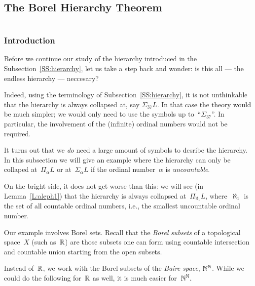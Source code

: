 \documentclass[main.tex]{subfiles}
\begin{document}
%
%
\subsection{The Borel Hierarchy Theorem}$\,$\\
\subsubsection{Introduction}$\,$\\
Before we continue our study of the hierarchy introduced in the
Subsection~\ref{SS:hierarchy}, let us take a step back and wonder: 
 is this all --- the endless hierarchy --- neccesary?

Indeed,
using the terminology of Subsection~\ref{SS:hierarchy},
it is not unthinkable
that the hierarchy is always collapsed
at, say $\Sigma_{37} L$.
In that case 
the theory would be much simpler;
we would only need to
use the symbols up to~``$\Sigma_{37}$''.
In particular,
the involvement of the (infinite) ordinal numbers would not be required.

It turns out that we \emph{do} need a large amount of symbols
to desribe the hierarchy.
In this subsection we will give an example
where the hierarchy can only be collaped at~$\Pi_\alpha L$
or at~$\Sigma_\alpha L$
if the ordinal number~$\alpha$ is \emph{uncountable}.

On the bright side,
it does not get worse than this:
we will see 
(in Lemma~\ref{L:aleph1})
that 
the hierarchy is always collapsed at~$\Pi_{\aleph_1} L$,
where~$\aleph_1$
is the set of all countable ordinal numbers,
i.e., the smallest uncountable ordinal number.

Our example involves Borel sets.
Recall that the \emph{Borel subsets}
of a topological space~$X$
(such as~$\mathbb{R}$)
are those subsets one can form using countable intersection
and countable union starting from the open subsets.

Instead of~$\mathbb{R}$,
we  work with the Borel subsets
of the 
 \emph{Baire space},
 $\mathbb{N}^{\mathbb{N}}$.
While we could do the following
for~$\mathbb{R}$ as well,
it is much easier for~$\mathbb{N}^{\mathbb{N}}$.
\end{document}
